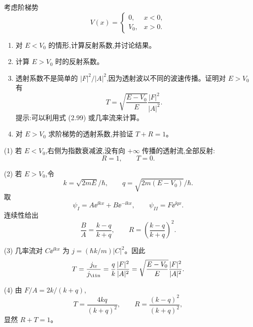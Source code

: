\begin{question}
考虑阶梯势
\[
V(x)=\begin{cases}0,&x<0,\\ V_0,&x>0.
\end{cases}
\]
\begin{enumerate}
\item 对 $E<V_0$ 的情形,计算反射系数,并讨论结果。
\item 计算 $E>V_0$ 时的反射系数。
\item 透射系数不是简单的 $|F|^2/|A|^2$,因为透射波以不同的波速传播。证明对 $E>V_0$ 有
\[
T=\sqrt{\frac{E-V_0}{E}}\frac{|F|^2}{|A|^2}.
\]
提示:可以利用式 (2.99) 或几率流来计算。
\item 对 $E>V_0$ 求阶梯势的透射系数,并验证 $T+R=1$。
\end{enumerate}

\par\smallskip
{}

\end{question}
\begin{solution}
(1) 若 $E<V_0$,右侧为指数衰减波,没有向 $+\infty$ 传播的透射流,全部反射:
\[
R=1,
\qquad T=0.
\]

(2) 若 $E>V_0$,令
\[
k=\sqrt{2mE}/\hbar,
\qquad
q=\sqrt{2m(E-V_0)}/\hbar.
\]
取
\[
\psi_I=A\ee^{\ii kx}+B\ee^{-\ii kx},
\qquad
\psi_{II}=F\ee^{\ii qx}.
\]
连续性给出
\[
\frac BA=\frac{k-q}{k+q},
\qquad
R=\left(\frac{k-q}{k+q}\right)^2.
\]

(3) 几率流对 $C\ee^{\ii kx}$ 为 $j=(\hbar k/m)|C|^2$。因此
\[
T=\frac{j_{\rm tr}}{j_{\rm \ii n}}
=\frac{q}{k}\frac{|F|^2}{|A|^2}
=\sqrt{\frac{E-V_0}{E}}\frac{|F|^2}{|A|^2}.
\]

(4) 由 $F/A=2k/(k+q)$,
\[
T=\frac{4kq}{(k+q)^2},
\qquad
R=\frac{(k-q)^2}{(k+q)^2},
\]
显然 $R+T=1$。
\end{solution}

